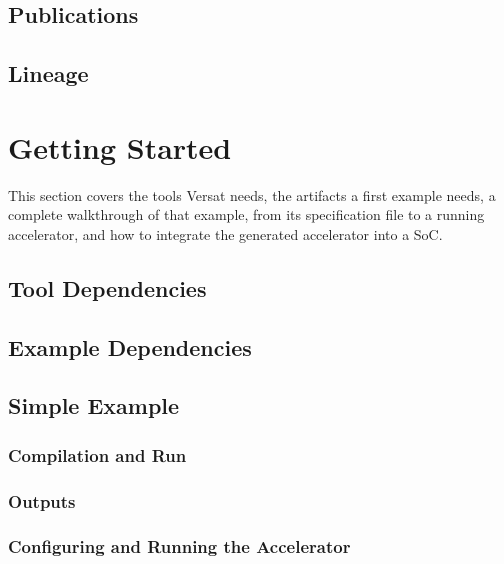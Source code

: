 \documentclass{ug}
\begin{document}
\subsection{Publications}
\label{sec:publications}


\subsection{Lineage}
\label{sec:lineage}


\ifdefined\SECTIONCLEARPAGE
\clearpage
\fi
\section{Getting Started}
\label{sec:getting_started}

This section covers the tools Versat needs, the artifacts a first example needs, a complete walkthrough of that example, from its specification file to a running accelerator, and how to integrate the generated accelerator into a SoC.

\subsection{Tool Dependencies}
\label{sec:dependencies}


\subsection{Example Dependencies}
\label{sec:example_dependencies}


\subsection{Simple Example}
\label{sec:simple_example}


\subsubsection{Compilation and Run}
\label{sec:simple_example_run}


\subsubsection{Outputs}
\label{sec:simple_example_outputs}


\subsubsection{Configuring and Running the Accelerator}
\label{sec:simple_example_software}

\end{document}

